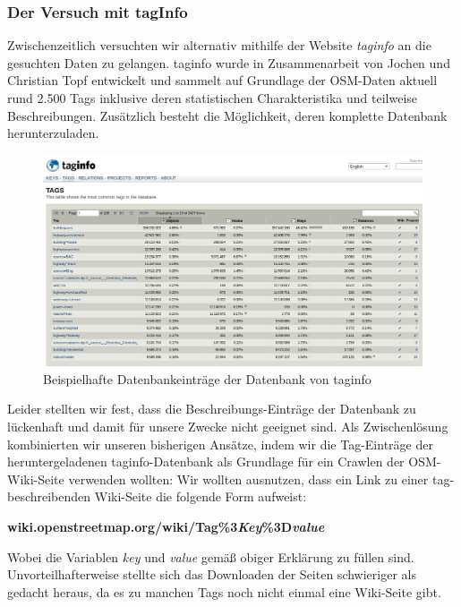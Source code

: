 \documentclass[12pt,pdftex,a4paper]{article}
\begin{document}
\subsubsection{Der Versuch mit tagInfo}\label{sec:tagInfo}
Zwischenzeitlich versuchten wir alternativ mithilfe der Website \textit{taginfo} \cite{taginfoWebsite} an die gesuchten Daten zu gelangen. taginfo wurde in Zusammenarbeit von Jochen und Christian Topf entwickelt und sammelt auf Grundlage der OSM-Daten aktuell rund 2.500 Tags inklusive deren statistischen Charakteristika und teilweise Beschreibungen\cite{taginfoAbout}. Zusätzlich besteht die Möglichkeit, deren komplette Datenbank herunterzuladen.\\
\begin{figure}[h]
	\centering
	\includegraphics[width=0.9\linewidth]{Bilder/taginfo_example}
	\caption[Beispielhafte Darstellung taginfo]{Beispielhafte Datenbankeinträge der Datenbank von taginfo}
	\label{fig:taginfoexample}
\end{figure}
Leider stellten wir fest, dass die Beschreibungs-Einträge der Datenbank zu lückenhaft und damit für unsere Zwecke nicht geeignet sind.
Als Zwischenlösung kombinierten wir unseren bisherigen Ansätze, indem wir die Tag-Einträge der heruntergeladenen taginfo-Datenbank als Grundlage für ein Crawlen der OSM-Wiki-Seite verwenden wollten: Wir wollten ausnutzen, dass ein Link zu einer tag-beschreibenden Wiki-Seite die folgende Form aufweist:
\begin{center}
	\textbf{wiki.openstreetmap.org/wiki/Tag\%3\textit{Key}\%3D\textit{value}}
\end{center}
Wobei die Variablen \textit{key} und \textit{value} gemäß obiger Erklärung zu füllen sind. Unvorteilhafterweise stellte sich das Downloaden der Seiten schwieriger als gedacht heraus, da es zu manchen Tags noch nicht einmal eine Wiki-Seite gibt.
\end{document}

